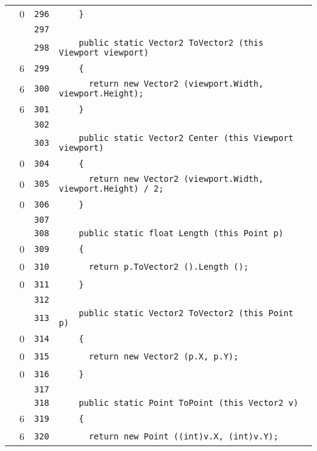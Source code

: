 \documentclass[a4paper,10pt]{article}
\begin{document}
\begin{longtable}[l]{lrrl}
\cellcolor{red} & 0 & \verb~296~ & \verb~    }~\\
\cellcolor{gray} &  & \verb~297~ & \verb~~\\
\cellcolor{gray} &  & \verb~298~ & \verb~    public static Vector2 ToVector2 (this Viewport viewport)~\\
\cellcolor{green} & 6 & \verb~299~ & \verb~    {~\\
\cellcolor{green} & 6 & \verb~300~ & \verb~      return new Vector2 (viewport.Width, viewport.Height);~\\
\cellcolor{green} & 6 & \verb~301~ & \verb~    }~\\
\cellcolor{gray} &  & \verb~302~ & \verb~~\\
\cellcolor{gray} &  & \verb~303~ & \verb~    public static Vector2 Center (this Viewport viewport)~\\
\cellcolor{red} & 0 & \verb~304~ & \verb~    {~\\
\cellcolor{red} & 0 & \verb~305~ & \verb~      return new Vector2 (viewport.Width, viewport.Height) / 2;~\\
\cellcolor{red} & 0 & \verb~306~ & \verb~    }~\\
\cellcolor{gray} &  & \verb~307~ & \verb~~\\
\cellcolor{gray} &  & \verb~308~ & \verb~    public static float Length (this Point p)~\\
\cellcolor{red} & 0 & \verb~309~ & \verb~    {~\\
\cellcolor{red} & 0 & \verb~310~ & \verb~      return p.ToVector2 ().Length ();~\\
\cellcolor{red} & 0 & \verb~311~ & \verb~    }~\\
\cellcolor{gray} &  & \verb~312~ & \verb~~\\
\cellcolor{gray} &  & \verb~313~ & \verb~    public static Vector2 ToVector2 (this Point p)~\\
\cellcolor{red} & 0 & \verb~314~ & \verb~    {~\\
\cellcolor{red} & 0 & \verb~315~ & \verb~      return new Vector2 (p.X, p.Y);~\\
\cellcolor{red} & 0 & \verb~316~ & \verb~    }~\\
\cellcolor{gray} &  & \verb~317~ & \verb~~\\
\cellcolor{gray} &  & \verb~318~ & \verb~    public static Point ToPoint (this Vector2 v)~\\
\cellcolor{green} & 6 & \verb~319~ & \verb~    {~\\
\cellcolor{green} & 6 & \verb~320~ & \verb~      return new Point ((int)v.X, (int)v.Y);~\\

\end{longtable}
\end{document}
